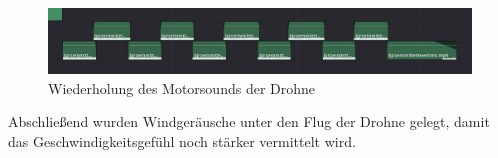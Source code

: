 \begin{figure}[H]
\begin{center}
\includegraphics[width=\textwidth]{gfx/post/sample.jpg}
\caption{Wiederholung des Motorsounds der Drohne}
\label{sample}
\end{center}
\end{figure}
\noindent
Abschließend wurden Windgeräusche unter den Flug der Drohne gelegt, damit das Geschwindigkeitsgefühl noch stärker vermittelt wird. 